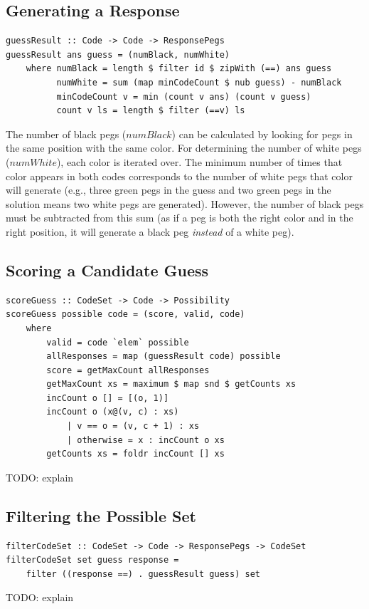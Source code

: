 \documentclass{article}
\begin{document}
\subsection{Generating a Response}
\begin{verbatim}
guessResult :: Code -> Code -> ResponsePegs
guessResult ans guess = (numBlack, numWhite)
    where numBlack = length $ filter id $ zipWith (==) ans guess
          numWhite = sum (map minCodeCount $ nub guess) - numBlack
          minCodeCount v = min (count v ans) (count v guess)
          count v ls = length $ filter (==v) ls
\end{verbatim}
The number of black pegs ($numBlack$) can be calculated by looking for pegs in the same position with the same color. For determining the number of white pegs ($numWhite$), each color is iterated over. The minimum number of times that color appears in both codes corresponds to the number of white pegs that color will generate (e.g., three green pegs in the guess and two green pegs in the solution means two white pegs are generated). However, the number of black pegs must be subtracted from this sum (as if a peg is both the right color and in the right position, it will generate a black peg \textit{instead} of a white peg).

\subsection{Scoring a Candidate Guess}
\begin{verbatim}
scoreGuess :: CodeSet -> Code -> Possibility
scoreGuess possible code = (score, valid, code)
    where
        valid = code `elem` possible
        allResponses = map (guessResult code) possible
        score = getMaxCount allResponses
        getMaxCount xs = maximum $ map snd $ getCounts xs
        incCount o [] = [(o, 1)]
        incCount o (x@(v, c) : xs)
            | v == o = (v, c + 1) : xs
            | otherwise = x : incCount o xs
        getCounts xs = foldr incCount [] xs
\end{verbatim}
TODO: explain

\subsection{Filtering the Possible Set}
\begin{verbatim}
filterCodeSet :: CodeSet -> Code -> ResponsePegs -> CodeSet
filterCodeSet set guess response =
    filter ((response ==) . guessResult guess) set
\end{verbatim}
TODO: explain
\end{document}
